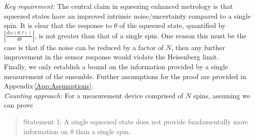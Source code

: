 \documentclass[reqno]{amsart}
\def\est#1{\hat{#1}}
\newcommand{\ket}[1]{\left| #1 \right>}
\begin{document}
\emph{Key requirement:} The central claim in squeezing enhanced metrology is that squeezed states have an improved intrinsic noise/uncertainty compared to a single spin. It is clear that the response to $\theta$ of the squeezed state, quantified by $\left|\frac{d\ket{\psi(\theta,t)}}{d \theta}\right|$, is not greater than that of a single spin. One reason this must be the case is that if the noise can be reduced by a factor of $N$, then any further improvement in the sensor response would violate the Heisenberg limit.\\%

Finally, we only establish a bound on the information provided by a single measurement of the ensemble. Further assumptions for the proof are provided in Appendix\,\ref{App:Assumptions}.\\


\emph{Counting approach:} For a measurement device comprised of $N$ spins, assuming we can prove
\begin{quotation}
Statement 1: A single squeezed state does not provide fundamentally more information on $\theta$ than a single spin.
\end{quotation}
\end{document}
